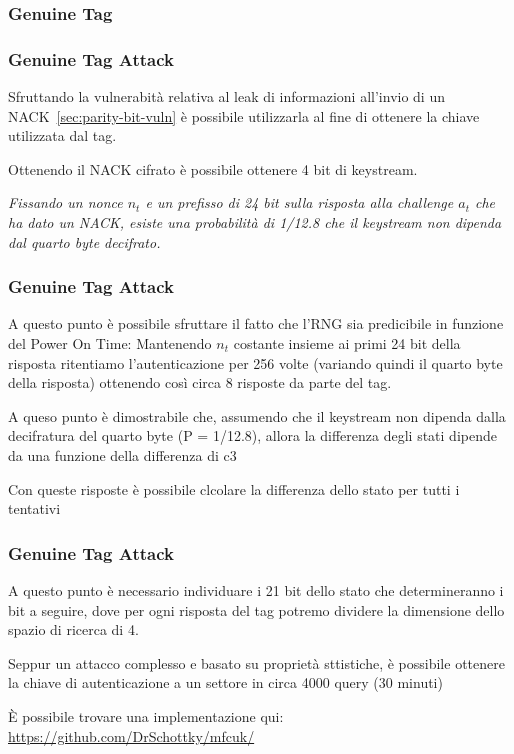 \subsubsection{Genuine Tag}
\begin{frame}
    \frametitle{Genuine Tag Attack}
    Sfruttando la vulnerabità relativa al leak di informazioni all'invio di un NACK~\ref{sec:parity-bit-vuln} è possibile utilizzarla al fine di ottenere 
    la chiave utilizzata dal tag.\pause

    Ottenendo il NACK cifrato è possibile ottenere 4 bit di keystream.\pause

    \textit{Fissando un nonce $n_t$ e un prefisso di 24 bit sulla risposta alla challenge $a_t$ che ha dato un NACK, esiste una probabilità di 1/12.8 che il keystream non dipenda dal quarto byte decifrato.}\cite{Courtois2009TheDS}
\end{frame}

\begin{frame}
    \frametitle{Genuine Tag Attack}
    A questo punto è possibile sfruttare il fatto che l'RNG sia predicibile in funzione del Power On Time:
    Mantenendo $n_t$ costante insieme ai primi 24 bit della risposta ritentiamo l'autenticazione per 256 volte 
    (variando quindi il quarto byte della risposta) ottenendo così circa 8 risposte da parte del tag.\pause

    A queso punto è dimostrabile che, assumendo che il keystream non dipenda dalla decifratura del quarto byte (P = 1/12.8), allora
    la differenza degli stati dipende da una funzione della differenza di c3\cite{Courtois2009TheDS}\pause

    Con queste risposte è possibile clcolare la differenza dello stato per tutti i tentativi
\end{frame}

\begin{frame}
    \frametitle{Genuine Tag Attack}
    A questo punto è necessario individuare i 21 bit dello stato che determineranno i bit a seguire, dove per ogni risposta del tag
    potremo dividere la dimensione dello spazio di ricerca di 4.\pause

    Seppur un attacco complesso e basato su proprietà sttistiche, è possibile ottenere la chiave di autenticazione a un settore in circa 4000 query (30 minuti)\pause

    È possibile trovare una implementazione qui: \href{https://github.com/DrSchottky/mfcuk/blob/master/src/mfcuk.c\#L623}{https://github.com/DrSchottky/mfcuk/}
\end{frame}

